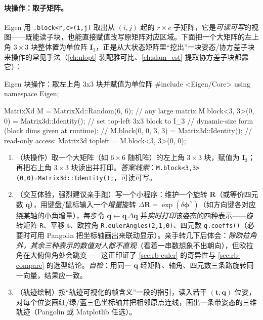 \paragraph{块操作：取子矩阵。}Eigen 用 \texttt{.block<r,c>(i,j)} 取出从 $(i,j)$ 起的 $r\times c$ 子矩阵，它是\emph{可读可写}的视图——既能读子块，也能直接赋值改写原矩阵对应区域。下面把一个大矩阵的左上角 $3\times3$ 块整体置为单位阵 $\mathbf{I}_3$，正是从大状态矩阵里“挖出”一块姿态/协方差子块来操作的常见手法（\cref{ch:nlopt} 装配雅可比、\cref{ch:slam_est} 提取协方差子块都靠它）：
\begin{codebox}[C++]{Eigen 块操作：取左上角 3x3 块并赋值为单位阵}
#include <Eigen/Core>
using namespace Eigen;

MatrixXd M = MatrixXd::Random(6, 6);          // any large matrix
M.block<3, 3>(0, 0) = Matrix3d::Identity();   // set top-left 3x3 block to I_3
// dynamic-size form (block dims given at runtime):
// M.block(0, 0, 3, 3) = Matrix3d::Identity();
// read-only access: Matrix3d topleft = M.block<3, 3>(0, 0);
\end{codebox}

\begin{practice}
\begin{enumerate}
  \item （块操作）取一个大矩阵（如 $6\times6$ 随机阵）的左上角 $3\times3$ 块，赋值为 $\mathbf{I}_3$；再把右上角 $3\times3$ 块读出并打印。\emph{答案线索}：\texttt{M.block<3,3>(0,0)=Matrix3d::Identity();}，可读可写。
  \item （交互体验，强烈建议亲手跑）写一个小程序：维护一个旋转 $\mathbf{R}$（或等价四元数 $\mathbf{q}$），用键盘/鼠标输入一个\emph{增量}旋转 $\Delta\mathbf{R}=\exp(\delta\boldsymbol{\phi}^\wedge)$（如方向键各对应绕某轴的小角增量），每步令 $\mathbf{q}\leftarrow\mathbf{q}\,\Delta\mathbf{q}$ 并\emph{实时打印}该姿态的四种表示——旋转矩阵 \texttt{R}、平移 $\mathbf{t}$、欧拉角 \texttt{R.eulerAngles(2,1,0)}、四元数 \texttt{q.coeffs()}（必要时可用 Pangolin 把坐标轴画出来联动显示）。亲手转几下后体会：\emph{除欧拉角外，其余三种表示的数值对人都不直观}（看着一串数想象不出朝向），但欧拉角在大俯仰角处会跳变——这正印证了 \cref{sec:rb-euler} 的奇异性与 \cref{sec:rb-compare} 的选型结论。\emph{自检}：用同一 $\mathbf{q}$ 经矩阵、轴角、四元数三条路旋转同一向量，结果应一致。
  \item （轨迹绘制）按“轨迹可视化的帧含义”一段的指引，读入若干 $(\mathbf{t},\mathbf{q})$ 位姿，对每个位姿画红/绿/蓝三色坐标轴并把相邻原点连线，画出一条带姿态的三维轨迹（Pangolin 或 Matplotlib 任选）。
\end{enumerate}
\end{practice}

